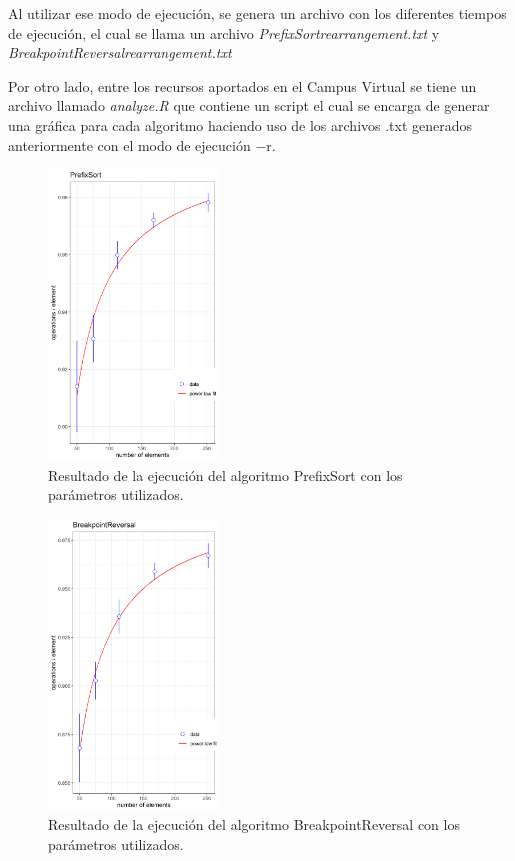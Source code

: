 \documentclass[11pt,letterpaper]{article}
\begin{document}
Al utilizar ese modo de ejecución, se genera un archivo con los diferentes tiempos de ejecución, el cual se llama  un archivo \textit{PrefixSortrearrangement.txt} y \textit{BreakpointReversalrearrangement.txt}

Por otro lado, entre los recursos aportados en el Campus Virtual se tiene un archivo llamado \textit{analyze.R} que contiene un script el cual se encarga de generar una gráfica para cada algoritmo haciendo uso de los archivos .txt generados anteriormente con el modo de ejecución $-$r.
\begin{multicols}{2}
	\begin{figure}[H]
		\centering
		\includegraphics[width=0.4\textwidth]{img/PrefixSort.png}
		\caption{Resultado de la ejecución del algoritmo PrefixSort con los parámetros utilizados.}
		\label{fig:graficoPS}
	\end{figure}
	
	\begin{figure}[H]
		\centering
		\includegraphics[width=0.4\textwidth]{img/BreakpointReversal.png}
		\caption{Resultado de la ejecución del algoritmo BreakpointReversal con los parámetros utilizados.}
		\label{fig:graficoBPR}
	\end{figure}
	
\end{multicols}
\end{document}
